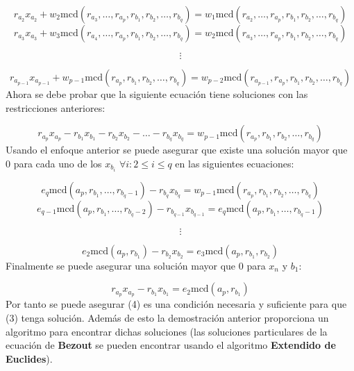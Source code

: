 \documentclass{article}
\begin{document}
\begin{equation}
    r_{a_2}x_{a_2}+w_2\text{mcd}(r_{a_3},\ldots,r_{a_p},r_{b_1},r_{b_2},\ldots,r_{b_q}) =w_1\text{mcd}(r_{a_2},\ldots,r_{a_p},r_{b_1},r_{b_2},\ldots,r_{b_q})
\end{equation}
\begin{equation}
    r_{a_3}x_{a_3}+w_3\text{mcd}(r_{a_4},\ldots,r_{a_p},r_{b_1},r_{b_2},\ldots,r_{b_q}) =w_2\text{mcd}(r_{a_3},\ldots,r_{a_p},r_{b_1},r_{b_2},\ldots,r_{b_q})
\end{equation}

$$\vdots $$

\begin{equation}
    r_{a_{p-1}}x_{a_{p-1}}+w_{p-1}\text{mcd}(r_{a_p},r_{b_1},r_{b_2},\ldots,r_{b_q}) =w_{p-2}\text{mcd}(r_{a_{p-1}},r_{a_p},r_{b_1},r_{b_2},\ldots,r_{b_q})
\end{equation}
Ahora se debe probar que la siguiente ecuación tiene soluciones con las restricciones anteriores:

\begin{equation}
    r_{a_p}x_{a_p}-r_{b_1}x_{b_1}-r_{b_2}x_{b_2}-\ldots -r_{b_q}x_{b_q}= w_{p-1}\text{mcd}(r_{a_p},r_{b_1},r_{b_2},\ldots,r_{b_q})
\end{equation}
Usando el enfoque anterior se puede asegurar que existe una solución mayor que 0 para cada uno de los $x_{b_i}$ $\forall i: 2\leq i\leq q$  en las siguientes ecuaciones:

\begin{equation}
    e_{q}\text{mcd}(a_p, r_{b_1},\ldots,r_{b_q-1})-r_{b_q}x_{b_q} =w_{p-1}\text{mcd}(r_{a_p},r_{b_1},r_{b_2},\ldots,r_{b_q})
\end{equation}
\begin{equation}
    e_{q-1}\text{mcd}(a_p, r_{b_1},\ldots,r_{b_q-2})-r_{b_{q-1}}x_{b_{q-1}} =e_{q}\text{mcd}(a_p, r_{b_1},\ldots,r_{b_q-1})
\end{equation}

$$\vdots $$

\begin{equation}
    e_{2}\text{mcd}(a_p, r_{b_1})-r_{b_2}x_{b_2} =e_{3}\text{mcd}(a_p, r_{b_1}, r_{b_2})
\end{equation}
Finalmente se puede asegurar una solución mayor que 0 para $x_n$ y $b_1$:

\begin{equation}
    r_{a_p}x_{a_p}-r_{b_1}x_{b_1} =e_{2}\text{mcd}(a_p, r_{b_1})
\end{equation}
Por tanto se puede asegurar (4) es una condición necesaria y suficiente para que (3) tenga solución. Además de esto la demostración
anterior proporciona un algoritmo para encontrar dichas soluciones (las soluciones particulares de la ecuación de \textbf{Bezout} se pueden encontrar
usando el algoritmo \textbf{Extendido de Euclides}).
\end{document}
